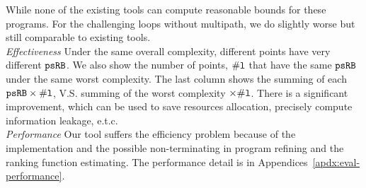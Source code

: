While none of the existing tools can compute reasonable bounds for these programs.
For the challenging loops without multipath, we do slightly worse but still comparable to existing tools.
\\
\emph{Effectiveness}
\newcommand{\pointnum}{\kw{\# l}}
Under the same overall complexity, different points have very different $\mathtt{psRB}$.
We also show the number of points, $\pointnum$ that have the same $\mathtt{psRB}$ under the same worst complexity.
The last column shows the summing of each $\psRB \times \pointnum$, V.S. summing of the worst complexity $\times \pointnum$.
There is a significant improvement, which can be used to save resources allocation,
precisely compute information leakage, e.t.c.
\\
\emph{Performance}
Our tool suffers the efficiency problem because of the implementation and the possible non-terminating in program refining and the ranking function estimating.
The performance detail is in Appendices~\ref{apdx:eval-performance}.
